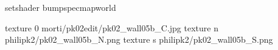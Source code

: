 setshader bumpspecmapworld

texture 0 morti/pk02edit/pk02_wall05b_C.jpg
texture n philipk2/pk02_wall05b_N.png
texture s philipk2/pk02_wall05b_S.png

